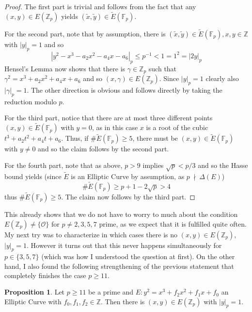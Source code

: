 \documentclass{scrartcl}
\newcommand{\Z}{\mathbb{Z}}
\newcommand{\F}{\mathbb{F}}
\renewcommand{\O}{\mathcal{O}}
\newcommand{\notdivides}{\ \nmid \ }
\theoremstyle{definition}
\newtheorem{prop}[subsection]{Proposition}
\begin{document}
\begin{proof}
    The first part is trivial and follows from the fact that any $(x, y) \in E(\Z_p)$ yields $(\tilde{x}, \tilde{y}) \in \tilde{E}(\F_p)$.

    For the second part, note that by assumption, there is $(\tilde{x}, \tilde{y}) \in \tilde{E}(\F_p), x, y \in \Z$ with $|y|_p = 1$ and so
    \begin{equation*}
        |y^2 - x^3 - a_2 x^2 - a_4 x - a_6|_p \leq p^{-1} < 1 = 1^2 = |2y|_p
    \end{equation*}
    Hensel's Lemma now \cite[Thm 2.14]{lecture} shows that there is $\gamma \in \Z_p$ such that $\gamma^2 = x^3 + a_2 x^2 + a_4 x + a_6$ and so $(x, \gamma) \in E(\Z_p)$.
    Since $|y|_p = 1$ clearly also $|\gamma|_p = 1$.
    The other direction is obvious and follows directly by taking the reduction modulo $p$.

    For the third part, notice that there are at most three different points $(x, y) \in \tilde{E}(\F_p)$ with $y = 0$, as in this case $x$ is a root of the cubic $t^3 + a_2 t^2 + a_4 t + a_6$.
    Thus, if $\#\tilde{E}(\F_p) \geq 5$, there must be $(x, y) \in \tilde{E}(\F_p)$ with $y \neq 0$ and so the claim follows by the second part.

    For the fourth part, note that as above, $p > 9$ implies $\sqrt{p} < p/3$ and so the Hasse bound \cite[Thm 1.15]{lecture} yields (since $\tilde{E}$ is an Elliptic Curve by assumption, as $p \notdivides \Delta(E)$)
    \begin{equation*}
        \#\tilde{E}(\F_p) \geq p + 1 - 2\sqrt{p} > 4
    \end{equation*}
    thus $\#\tilde{E}(\F_p) \geq 5$. 
    The claim now follows by the third part.
\end{proof}
This already shows that we do not have to worry to much about the condition $E(\Z_p) \neq \{\O\}$ for $p \neq 2, 3, 5, 7$ prime, as we expect that it is fulfilled quite often.
My next try was to characterize in which cases there is no $(x, y) \in E(\Z_p)$, $|y|_p = 1$.
However it turns out that this never happens simultaneously for $p \in \{ 3, 5, 7 \}$ (which was how I understood the question at first).
On the other hand, I also found the following strengthening of the previous statement that completely finishes the case $p \geq 11$.
\begin{prop}
    \label{prop:points_in_EZp}
    Let $p \geq 11$ be a prime and $E: y^2 = x^3 + f_2 x^2 + f_1 x + f_0$ an Elliptic Curve with $f_0, f_1, f_2 \in \Z$.
    Then there is $(x, y) \in E(\Z_p)$ with $|y|_p = 1$.
\end{prop}
\end{document}
